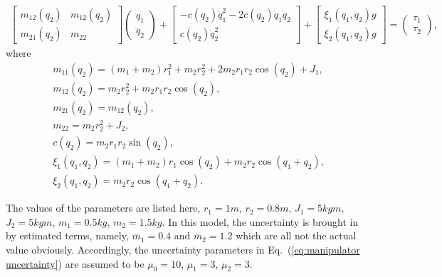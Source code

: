 \documentclass[3p]{elsarticle}
\theoremstyle{plain}
\theoremstyle{remark}
\begin{document}
\begin{align}
\begin{bmatrix}
m_{12}(q_2) &m_{12}(q_2)\\
m_{21}(q_2) &m_{22}
\end{bmatrix}
\begin{pmatrix}
\ddot q_1\\
\ddot q_2
\end{pmatrix}
+
\begin{bmatrix}
-c(q_2)\dot q_1^2-2c(q_2)\dot q_1\dot q_2\\
c(q_2)\dot q_2^2
\end{bmatrix}+
\begin{bmatrix}
\xi_1(q_1,q_2) g\\
\xi_2(q_1,q_2) g
\end{bmatrix}=
\begin{pmatrix}
\tau_1\\
\tau_2
\end{pmatrix},\label{eq:manipulator}
\end{align}
where
\begin{align*}
&m_{11}(q_2)=(m_1+m_2)r_1^2+m_2r_2^2+2m_2r_1r_2\cos(q_2)+J_1,\\
&m_{12}(q_2)=m_2r_2^2+m_2r_1r_2\cos(q_2),\\
&m_{21}(q_2)=m_{12}(q_2),\\
&m_{22}=m_2r_2^2+J_2,\\
&c(q_2)=m_2r_1r_2\sin(q_2),\\
&\xi_1(q_1,q_2) =(m_1+m_2)r_1\cos(q_2)+m_2r_2\cos(q_1+q_2),\\
&\xi_2(q_1,q_2) = m_2r_2\cos(q_1+q_2).
\end{align*}\par
The values of the parameters are listed here, $r_1=1m$, $r_2=0.8m$, $J_1=5 kgm$, $J_2=5kgm$, $m_1=0.5kg$, $m_2=1.5kg$. In this model, the uncertainty is brought in by estimated terms, namely, $\bar m_1=0.4$ and $\bar m_2=1.2$ which are all not the actual value obviously. Accordingly, the uncertainty parameters in Eq.~(\ref{eq:manipulator uncertainty}) are assumed to be $\mu_0=10$, $\mu_1=3$, $\mu_2=3$.
\end{document}

